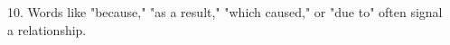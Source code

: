 \documentclass[12pt]{article}
\begin{document}
\vspace{3cm}

10. Words like "because," "as a result," "which caused," or "due to" often signal \\a \underline{\hspace{4cm}} relationship.

\vspace{3cm}
\newpage










\end{document}
